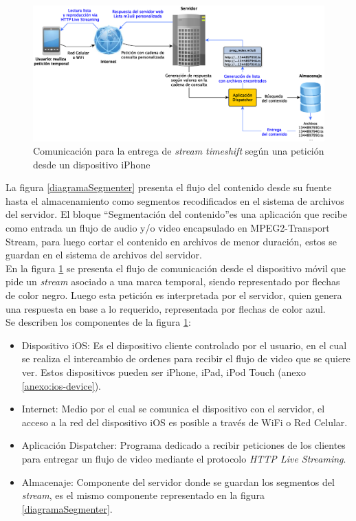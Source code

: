 \begin{figure}[H]
	\centering
	\includegraphics[scale=0.42]{imgs/diagrama-Dispatcher-Tedit.eps}
	\caption{Comunicación para la entrega de \textit{stream timeshift} según una petición desde un dispositivo iPhone}
	\label{diagramaGral}
\end{figure}

La figura \ref{diagramaSegmenter} presenta el flujo del contenido desde su fuente hasta el almacenamiento como segmentos recodificados en el sistema de archivos del servidor. El bloque \textquotedblleft Segmentación del contenido\textquotedblright es una aplicación que recibe como entrada un flujo de audio y/o video encapsulado en MPEG2-Transport Stream, para luego cortar el contenido en archivos de menor duración, estos se guardan en el sistema de archivos del servidor.\\

En la figura \ref{diagramaGral} se presenta el flujo de comunicación desde el dispositivo móvil que pide un \textit{stream} asociado a una marca temporal, siendo representado por flechas de color negro. Luego esta petición es interpretada por el servidor, quien genera una respuesta en base a lo requerido, representada por flechas de color azul. 
\\

Se describen los componentes de la figura \ref{diagramaGral}:
\begin{itemize}
\item Dispositivo iOS: Es el dispositivo cliente controlado por el usuario, en el cual se realiza el intercambio de ordenes para recibir el flujo de video que se quiere ver. Estos dispositivos pueden ser iPhone, iPad, iPod Touch (anexo \ref{anexo:ios-device}).

\item Internet: Medio por el cual se comunica el dispositivo con el servidor, el acceso a la red del dispositivo iOS es posible a través de WiFi o Red Celular. 

\item Aplicación Dispatcher: Programa dedicado a recibir peticiones de los clientes para entregar un flujo de video mediante el protocolo \textit{HTTP Live Streaming}.

\item Almacenaje: Componente del servidor donde se guardan los segmentos del \textit{stream}, es el mismo componente representado en la figura \ref{diagramaSegmenter}. 
\end{itemize}

